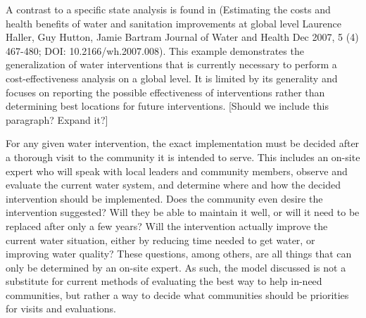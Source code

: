 A contrast to a specific state analysis is found in (Estimating the costs and health benefits of water and sanitation improvements at global level Laurence Haller, Guy Hutton, Jamie Bartram Journal of Water and Health Dec 2007, 5 (4) 467-480; DOI: 10.2166/wh.2007.008).
This example demonstrates the generalization of water interventions that is currently necessary to perform a cost-effectiveness analysis on a global level.
It is limited by its generality and focuses on reporting the possible effectiveness of interventions rather than determining best locations for future interventions.
[Should we include this paragraph? Expand it?]

For any given water intervention, the exact implementation must be decided after a thorough visit to the community it is intended to serve.
This includes an on-site expert who will speak with local leaders and community members, observe and evaluate the current water system, and determine where and how the decided intervention should be implemented.
Does the community even desire the intervention suggested?
Will they be able to maintain it well, or will it need to be replaced after only a few years?
Will the intervention actually improve the current water situation, either by reducing time needed to get water, or improving water quality?
These questions, among others, are all things that can only be determined by an on-site expert.
As such, the model discussed is not a substitute for current methods of evaluating the best way to help in-need communities, but rather a way to decide what communities should be priorities for visits and evaluations.